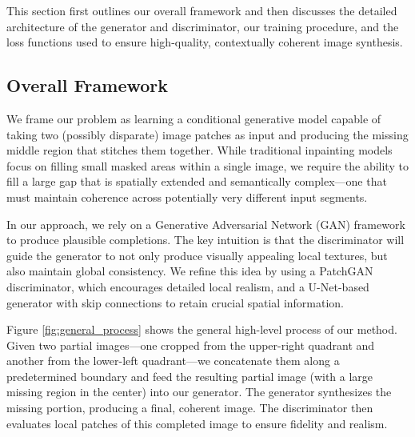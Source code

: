 \documentclass[sigconf]{acmart}
\begin{document}
This section first outlines our overall framework and then discusses the detailed architecture of the generator and discriminator, our training procedure, and the loss functions used to ensure high-quality, contextually coherent image synthesis.

\subsection*{Overall Framework}

We frame our problem as learning a conditional generative model capable of taking two (possibly disparate) image patches as input and producing the missing middle region that stitches them together. While traditional inpainting models focus on filling small masked areas within a single image, we require the ability to fill a large gap that is spatially extended and semantically complex—one that must maintain coherence across potentially very different input segments.

In our approach, we rely on a Generative Adversarial Network (GAN) framework to produce plausible completions. The key intuition is that the discriminator will guide the generator to not only produce visually appealing local textures, but also maintain global consistency. We refine this idea by using a PatchGAN discriminator, which encourages detailed local realism, and a U-Net-based generator with skip connections to retain crucial spatial information.

Figure \ref{fig:general_process} shows the general high-level process of our method. Given two partial images—one cropped from the upper-right quadrant and another from the lower-left quadrant—we concatenate them along a predetermined boundary and feed the resulting partial image (with a large missing region in the center) into our generator. The generator synthesizes the missing portion, producing a final, coherent image. The discriminator then evaluates local patches of this completed image to ensure fidelity and realism.
\end{document}
